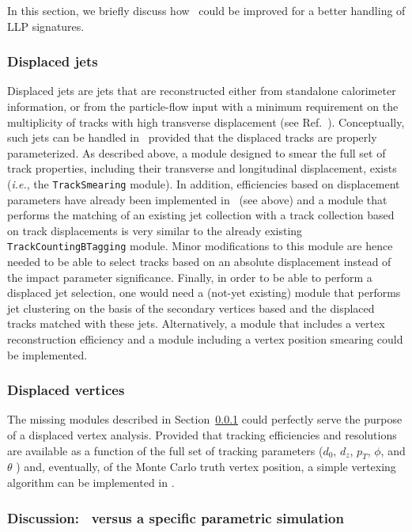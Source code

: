 In this section, we briefly discuss how \DEL\ could be improved for a better
handling of LLP signatures.

\subsubsection{Displaced jets}
\label{sec:dispjets}

Displaced jets are jets that are reconstructed either from standalone calorimeter
information, or from the particle-flow input with a minimum requirement on the
multiplicity of tracks with high transverse displacement (see
Ref.~\cite{CMS:2014wda}). Conceptually, such jets can be handled in \DEL\
provided that the displaced tracks are properly parameterized. As described
above, a module designed to smear the full set of track properties, including
their transverse and longitudinal displacement, exists ({\it i.e.}, the
\verb+TrackSmearing+ module). In addition, efficiencies based on displacement
parameters have already been implemented in \MA\ (see above) and a module that
performs the matching of an existing jet collection with a track collection
based on track displacements is very similar to the already existing
\verb+TrackCountingBTagging+ module. Minor modifications to this module are
hence needed to be able to select tracks based on an absolute displacement
instead of the impact parameter significance. Finally, in order to be able to
perform a displaced jet selection, one would need a (not-yet existing) module
that performs jet clustering on the basis of the secondary vertices based and
the displaced tracks matched with these jets. Alternatively, a module that
includes a vertex reconstruction efficiency and a module including a vertex
position smearing could be implemented.


\subsubsection{Displaced vertices}

The missing modules described in Section~\ref{sec:dispjets} could perfectly
serve the purpose of a displaced vertex analysis. Provided that tracking
efficiencies and resolutions are available as a function of the full set of
tracking parameters ($d_0$, $d_z$, $p_T$, $\phi$, and $\theta$ ) and,
eventually, of the Monte Carlo truth vertex position, a simple vertexing
algorithm can be implemented in \DEL.

\subsubsection{Discussion: \DEL\ versus a specific parametric simulation}

